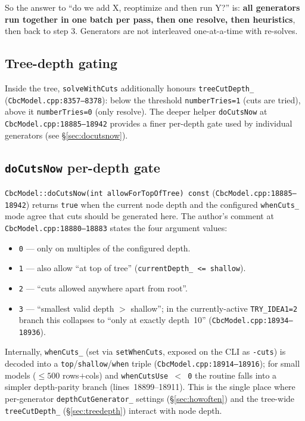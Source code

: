 \documentclass[11pt,a4paper]{article}
\begin{document}
So the answer to ``do we add X, reoptimize and then run Y?'' is:
\textbf{all generators run together in one batch per pass, then one
resolve, then heuristics}, then back to step 3.  Generators are not
interleaved one-at-a-time with re-solves.

\subsection*{Tree-depth gating}
\label{sec:treedepth}

Inside the tree, \texttt{solveWithCuts} additionally honours
\texttt{treeCutDepth\_} (\texttt{CbcModel.cpp:8357--8378}): below the
threshold \texttt{numberTries=1} (cuts are tried), above it
\texttt{numberTries=0} (only resolve).  The deeper helper
\texttt{doCutsNow} at \texttt{CbcModel.cpp:18885--18942} provides a
finer per-depth gate used by individual generators (see
\S\ref{sec:docutsnow}).

\subsection*{\texttt{doCutsNow} per-depth gate}
\label{sec:docutsnow}

\texttt{CbcModel::doCutsNow(int allowForTopOfTree) const}
(\texttt{CbcModel.cpp:18885--18942}) returns \texttt{true} when the
current node depth and the configured \texttt{whenCuts\_} mode agree
that cuts should be generated here.  The author's comment at
\texttt{CbcModel.cpp:18880--18883} states the four argument values:

\begin{itemize}[leftmargin=*]
  \item \texttt{0} --- only on multiples of the configured depth.
  \item \texttt{1} --- also allow ``at top of tree''
        (\texttt{currentDepth\_ <= shallow}).
  \item \texttt{2} --- ``cuts allowed anywhere apart from root''.
  \item \texttt{3} --- ``smallest valid depth $>$ shallow''; in the
        currently-active \texttt{TRY\_IDEA1=2} branch this collapses
        to ``only at exactly depth~10''
        (\texttt{CbcModel.cpp:18934--18936}).
\end{itemize}

Internally, \texttt{whenCuts\_} (set via \texttt{setWhenCuts},
exposed on the CLI as \texttt{-cuts}) is decoded into a
\texttt{top}/\texttt{shallow}/\texttt{when} triple
(\texttt{CbcModel.cpp:18914--18916}); for small models
($\le 500$ rows$+$cols) and \texttt{whenCutsUse $<$ 0} the routine
falls into a simpler depth-parity branch
(lines~18899--18911).  This is the single place where per-generator
\texttt{depthCutGenerator\_} settings (\S\ref{sec:howoften}) and the
tree-wide \texttt{treeCutDepth\_} (\S\ref{sec:treedepth}) interact
with node depth.
\end{document}
